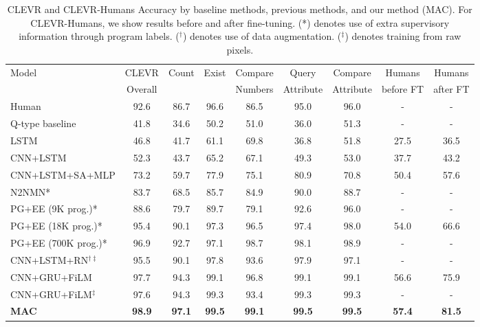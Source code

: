 \documentclass[fleqn]{article}
\begin{document}
\begin{table}
\caption{CLEVR and CLEVR-Humans Accuracy by baseline methods, previous methods, and our method (MAC). For CLEVR-Humans, we show results before and after fine-tuning. (*) denotes use of extra supervisory information through program labels. ($^{\dag}$) denotes use of data augmentation. ($^{\ddag}$) denotes training from raw pixels. }
\label{tab:table1}
\centering
\scriptsize 
\begin{tabular}{l@{}cccccccc}
\rowcolor{Blue1}
\scriptsize Model & CLEVR & Count & Exist & Compare & Query & Compare & Humans & Humans \\ 
\rowcolor{Blue1}
 & Overall            &           &          & Numbers & Attribute & Attribute & before FT & after FT \\
\tiny Human \citep{pgee} & 92.6 & 86.7 & 96.6 & 86.5 & 95.0 & 96.0 & - & - \\
\tiny Q-type baseline \citep{pgee} & 41.8 & 34.6 & 50.2 & 51.0 & 36.0 & 51.3 & - & - \\
\tiny LSTM \citep{pgee} & 46.8 & 41.7 & 61.1 & 69.8 & 36.8 & 51.8 & 27.5 & 36.5 \\
\tiny CNN+LSTM \citep{pgee} & 52.3 & 43.7 & 65.2 & 67.1 & 49.3 & 53.0 & 37.7 & 43.2 \\
\tiny CNN+LSTM+SA+MLP \citep{clevr} & 73.2 & 59.7 & 77.9 & 75.1 & 80.9 & 70.8 & 50.4 & 57.6 \\
\rowcolor{Blue2}
\tiny N2NMN* \citep{nmn3} & 83.7 & 68.5 & 85.7 & 84.9 & 90.0 & 88.7  & - & - \\
\rowcolor{Blue2}
\tiny PG+EE (9K prog.)* \citep{pgee} & 88.6 & 79.7 & 89.7 & 79.1 & 92.6 & 96.0 & - & - \\
\rowcolor{Blue2}
\tiny PG+EE (18K prog.)* \citep{pgee} & 95.4 & 90.1 & 97.3 & 96.5 & 97.4 & 98.0 & 54.0 & 66.6 \\
\rowcolor{Blue2}
\tiny PG+EE (700K prog.)* \citep{pgee} & 96.9 & 92.7 & 97.1 & 98.7 & 98.1 & 98.9 & - & - \\
\tiny CNN+LSTM+RN$^{\dag\ddag}$ \citep{rn} & 95.5 & 90.1 & 97.8 & 93.6 & 97.9 & 97.1 & - & - \\
\tiny CNN+GRU+FiLM \citep{film} & 97.7 & 94.3 & 99.1 & 96.8 & 99.1 & 99.1 & 56.6 & 75.9\\
\tiny CNN+GRU+FiLM$^{\ddag}$ \citep{film} & 97.6 & 94.3 & 99.3 & 93.4 & 99.3 & 99.3 & - & - \\[1ex]
\rowcolor{Blue1}
\textbf{MAC} & \textbf{98.9} & \textbf{97.1} & \textbf{99.5} & \textbf{99.1} & \textbf{99.5} & \textbf{99.5} & \textbf{57.4} & \textbf{81.5}\\
\end{tabular}
\end{table}
 
\end{document}

